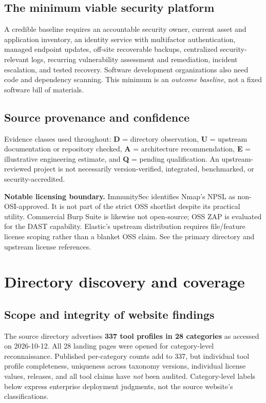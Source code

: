 \documentclass[11pt,oneside]{report}
\begin{document}
\section{The minimum viable security platform}
A credible baseline requires an accountable security owner, current asset and application inventory, an identity service with multifactor authentication, managed endpoint updates, off-site recoverable backups, centralized security-relevant logs, recurring vulnerability assessment and remediation, incident escalation, and tested recovery. Software development organizations also need code and dependency scanning. This minimum is an \emph{outcome baseline}, not a fixed software bill of materials.

\section{Source provenance and confidence}
Evidence classes used throughout: \textbf{D} = directory observation, \textbf{U} = upstream documentation or repository checked, \textbf{A} = architecture recommendation, \textbf{E} = illustrative engineering estimate, and \textbf{Q} = pending qualification. An upstream-reviewed project is not necessarily version-verified, integrated, benchmarked, or security-accredited.

\begin{caution}
\textbf{Notable licensing boundary.} ImmunitySec identifies Nmap's NPSL as non-OSI-approved\cite{immunity,nmap}. It is not part of the strict OSS shortlist despite its practical utility. Commercial Burp Suite is likewise not open-source; OSS ZAP is evaluated for the DAST capability. Elastic's upstream distribution requires file/feature license scoping rather than a blanket OSS claim. See the primary directory and upstream license references.
\end{caution}

\chapter{Directory discovery and coverage}
\section{Scope and integrity of website findings}
The source directory advertises \textbf{337 tool profiles in 28 categories}\cite{immunity} as accessed on 2026-10-12. All 28 landing pages were opened for category-level reconnaissance. Published per-category counts add to 337, but individual tool profile completeness, uniqueness across taxonomy versions, individual license values, releases, and all tool claims have \emph{not} been audited. Category-level labels below express enterprise deployment judgments, not the source website's classifications.
\end{document}
